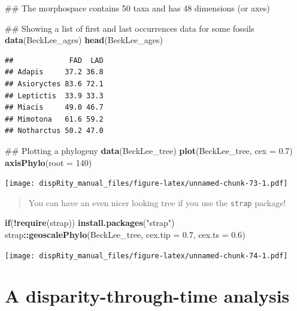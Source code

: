 \documentclass[]{book}
\newenvironment{Shaded}{\begin{snugshade}}{\end{snugshade}}
\newcommand{\KeywordTok}[1]{\textcolor[rgb]{0.13,0.29,0.53}{\textbf{#1}}}
\newcommand{\DataTypeTok}[1]{\textcolor[rgb]{0.13,0.29,0.53}{#1}}
\newcommand{\DecValTok}[1]{\textcolor[rgb]{0.00,0.00,0.81}{#1}}
\newcommand{\FloatTok}[1]{\textcolor[rgb]{0.00,0.00,0.81}{#1}}
\newcommand{\StringTok}[1]{\textcolor[rgb]{0.31,0.60,0.02}{#1}}
\newcommand{\ControlFlowTok}[1]{\textcolor[rgb]{0.13,0.29,0.53}{\textbf{#1}}}
\newcommand{\OperatorTok}[1]{\textcolor[rgb]{0.81,0.36,0.00}{\textbf{#1}}}
\newcommand{\NormalTok}[1]{#1}
\theoremstyle{definition}
\theoremstyle{definition}
\theoremstyle{remark}
\begin{document}
\begin{Shaded}
\begin{Highlighting}[]
\NormalTok{## The morphospace contains 50 taxa and has 48 dimensions (or axes)}

\NormalTok{## Showing a list of first and last occurrences data for some fossils}
\KeywordTok{data}\NormalTok{(BeckLee_ages)}
\KeywordTok{head}\NormalTok{(BeckLee_ages)}
\end{Highlighting}
\end{Shaded}

\begin{verbatim}
##             FAD  LAD
## Adapis     37.2 36.8
## Asioryctes 83.6 72.1
## Leptictis  33.9 33.3
## Miacis     49.0 46.7
## Mimotona   61.6 59.2
## Notharctus 50.2 47.0
\end{verbatim}

\begin{Shaded}
\begin{Highlighting}[]
\NormalTok{## Plotting a phylogeny}
\KeywordTok{data}\NormalTok{(BeckLee_tree)}
\KeywordTok{plot}\NormalTok{(BeckLee_tree, }\DataTypeTok{cex =} \FloatTok{0.7}\NormalTok{)}
\KeywordTok{axisPhylo}\NormalTok{(}\DataTypeTok{root =} \DecValTok{140}\NormalTok{)}
\end{Highlighting}
\end{Shaded}

\texttt{[image: dispRity\_manual\_files/figure-latex/unnamed-chunk-73-1.pdf]}

\begin{quote}
You can have an even nicer looking tree if you use the \texttt{strap}
package!
\end{quote}

\begin{Shaded}
\begin{Highlighting}[]
\ControlFlowTok{if}\NormalTok{(}\OperatorTok{!}\KeywordTok{require}\NormalTok{(strap)) }\KeywordTok{install.packages}\NormalTok{(}\StringTok{"strap"}\NormalTok{)}
\NormalTok{strap}\OperatorTok{::}\KeywordTok{geoscalePhylo}\NormalTok{(BeckLee_tree, }\DataTypeTok{cex.tip =} \FloatTok{0.7}\NormalTok{, }\DataTypeTok{cex.ts =} \FloatTok{0.6}\NormalTok{)}
\end{Highlighting}
\end{Shaded}

\texttt{[image: dispRity\_manual\_files/figure-latex/unnamed-chunk-74-1.pdf]}

\section{A disparity-through-time
analysis}\label{a-disparity-through-time-analysis}
\end{document}

